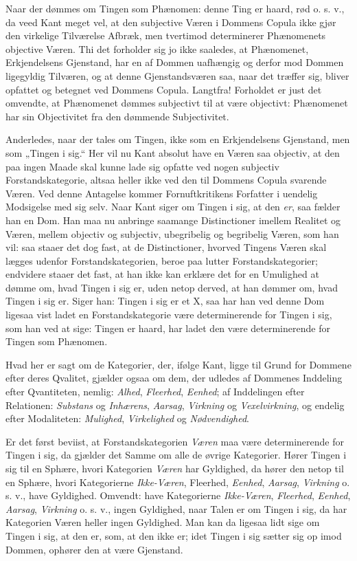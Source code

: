 \documentclass[12pt]{book}
\newcommand{\opage}[1]{\marginnote{\footnotesize\textit{[#1]}}}
\begin{document}
Naar der dømmes om Tingen som Phænomen: denne
Ting er haard, rød o. s. v., da veed Kant meget vel, at den
subjective Væren i Dommens Copula ikke gjør den virkelige
Tilværelse Afbræk, men tvertimod determinerer Phænomenets
objective Væren. Thi det forholder sig jo ikke saaledes, at
Phænomenet, Erkjendelsens Gjenstand, har en af Dommen
uafhængig og derfor mod Dommen ligegyldig Tilværen, og
at denne Gjenstandsværen saa, naar det træffer sig, bliver opfattet
og betegnet ved Dommens Copula. Langtfra! Forholdet
er just det omvendte, at Phænomenet dømmes subjectivt
til at være objectivt: Phænomenet har sin Objectivitet
fra den dømmende Subjectivitet.

Anderledes, naar der tales om Tingen, ikke som en Erkjendelsens
Gjenstand, men som „Tingen i sig.“ Her vil nu
Kant absolut have en Væren saa objectiv, at den paa ingen
Maade skal kunne lade sig opfatte ved nogen subjectiv Forstandskategorie,
altsaa heller ikke ved den til Dommens Copula
svarende Væren. Ved denne Antagelse kommer Fornuftkritikens
Forfatter i uendelig Modsigelse med sig selv. Naar
Kant siger om Tingen i sig, at den \emph{er}, saa fælder han en
Dom. Han maa nu anbringe saamange Distinctioner imellem
Realitet og Væren, mellem objectiv og subjectiv, ubegribelig
og begribelig Væren, som han vil: saa staaer det dog fast, at
\opage{115}de Distinctioner, hvorved Tingens Væren skal lægges udenfor
Forstandskategorien, beroe paa lutter Forstandskategorier; endvidere
staaer det fast, at han ikke kan erklære det for en Umulighed
at dømme om, hvad Tingen i sig er, uden netop derved,
at han dømmer om, hvad Tingen i sig er. Siger han:
Tingen i sig er et X, saa har han ved denne Dom ligesaa
vist ladet en Forstandskategorie være determinerende for Tingen
i sig, som han ved at sige: Tingen er haard, har ladet den
være determinerende for Tingen som Phænomen.

Hvad her er sagt om de Kategorier, der, ifølge Kant,
ligge til Grund for Dommene efter deres Qvalitet, gjælder
ogsaa om dem, der udledes af Dommenes Inddeling efter
Qvantiteten, nemlig: \emph{Alhed}, \emph{Fleerhed}, \emph{Eenhed}; af Inddelingen
efter Relationen: \emph{Substans} og \emph{Inhærens},
\emph{Aarsag}, \emph{Virkning} og \emph{Vexelvirkning}, og endelig efter
Modaliteten: \emph{Mulighed}, \emph{Virkelighed} og \emph{Nødvendighed}.

Er det først beviist, at Forstandskategorien \emph{Væren} maa
være determinerende for Tingen i sig, da gjælder det Samme
om alle de øvrige Kategorier. Hører Tingen i sig til en
Sphære, hvori Kategorien \emph{Væren} har Gyldighed, da hører
den netop til en Sphære, hvori Kategorierne \emph{Ikke-Væren},
Fleerhed, \emph{Eenhed}, \emph{Aarsag}, \emph{Virkning} o. s. v., have Gyldighed.
Omvendt: have Kategorierne \emph{Ikke-Væren}, \emph{Fleerhed}, %
\emph{Eenhed}, \emph{Aarsag}, \emph{Virkning} o. s. v., ingen Gyldighed,
naar Talen er om Tingen i sig, da har Kategorien Væren heller
ingen Gyldighed. Man kan da ligesaa lidt sige om Tingen i
sig, at den er, som, at den ikke er; idet Tingen i sig sætter sig
op imod Dommen, ophører den at være Gjenstand.
\end{document}

